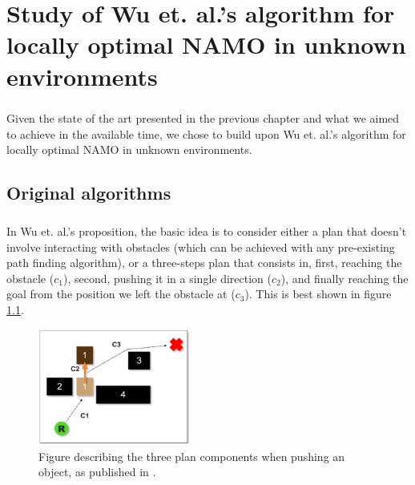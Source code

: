 
\chapter{Study of Wu et. al.'s algorithm for locally optimal NAMO in unknown environments} %

\label{Chapter3} %

\paragraph{} Given the state of the art presented in the previous chapter and what we aimed to achieve in the available time, we chose to build upon Wu et. al.'s algorithm for locally optimal NAMO in unknown environments.

\section{Original algorithms}

\paragraph{} In Wu et. al.'s proposition, the basic idea is to consider either a plan that doesn't involve interacting with obstacles (which can be achieved with any pre-existing path finding algorithm), or a three-steps plan that consists in, first, reaching the obstacle ($c_{1}$), second, pushing it in a single direction ($c_{2}$), and finally reaching the goal from the position we left the obstacle at ($c_{3}$). This is best shown in figure \ref{fig:Wu_Original_Algorithm-wu_components_illus}.

\begin{figure}[H]
\centering
\includegraphics[width=5cm]{Figures/Wu_Original_Algorithm/wu_components_illus.png}
\caption{Figure describing the three plan components when pushing an object, as published in \parencite{wu_navigation_2010}.}
\label{fig:Wu_Original_Algorithm-wu_components_illus}
\end{figure}

